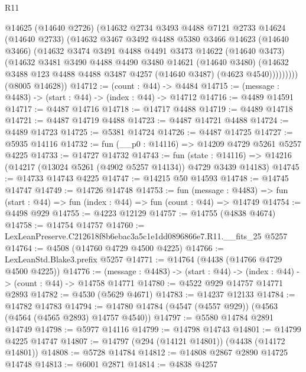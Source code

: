 \begin{lexlean}{R11}
\begin{coremodule}
            @14625
            (@14640 @2726)
            (@14632
              @2734
              @3493
              @4488
              @7121
              @2733
              @14624
              (@14640 @2733)
              (@14632
                @3467
                @3492
                @4488
                @5380
                @3466
                @14623
                (@14640 @3466)
                (@14632
                  @3474
                  @3491
                  @4488
                  @4491
                  @3473
                  @14622
                  (@14640 @3473)
                  (@14632
                    @3481
                    @3490
                    @4488
                    @4490
                    @3480
                    @14621
                    (@14640 @3480)
                    (@14632 @3488 @123 @4488 @4488 @3487 @4257 (@14640 @3487) (@4623 @4540)))))))))
      (@8005 @14628))
@14712 := (count : @44) -> @4484
@14715 := (message : @4483) -> (start : @44) -> (index : @44) -> @14712
@14716 := @4489 @14591
@14717 := @4487 @14716
@14718 := @14717 @4488
@14719 := @4489 @14718
@14721 := @4487 @14719 @4488
@14723 := @4487 @14721 @4488
@14724 := @4489 @14723
@14725 := @5381 @14724
@14726 := @4487 @14725
@14727 := @5935 @14116
@14732 := fun (__p0 : @14116) => @14209 @4729 @5261 @5257 @4225
@14733 := @14727 @14732
@14743 := fun (state : @14116) =>
  @14216 (@14217 (@13024 @5261 (@4902 @5257 @14134)) @4729 @3439 @14183)
@14745 := @14733 @14743 @4225
@14747 := @14215 @50 @14593
@14748 := @14745 @14747
@14749 := @14726 @14748
@14753 := fun (message : @4483) =>
  fun (start : @44) => fun (index : @44) => fun (count : @44) => @14749
@14754 := @4498 @929
@14755 := @4223 @12129
@14757 := @14755 (@4838 @4674)
@14758 := @14754 @14757
@14760 := LexLeanPreserve.C212618f8b6ebac3a5c1e1dd0896866e7.R11.__fits_25 @5257
@14764 := @4508 (@14760 @4729 @4500 @4225)
@14766 := LexLeanStd.Blake3.prefix @5257
@14771 := @14764 (@4438 (@14766 @4729 @4500 @4225))
@14776 := (message : @4483) -> (start : @44) -> (index : @44) -> (count : @44) -> @14758 @14771
@14780 := @4522 @929 @14757 @14771 @2893
@14782 := @4530 (@5629 @4671)
@14783 := @14237 @12133
@14784 := @14782 @14783
@14794 := @14780 @14784 (@4547 (@4557 @929)) (@4563 (@4564 (@4565 @2893) @14757 @4540))
@14797 := @5580 @14784 @2891 @14749
@14798 := @5977 @14116
@14799 := @14798 @14743
@14801 := @14799 @4225 @14747
@14807 := @14797 (@294 (@14121 @14801)) (@4438 (@14172 @14801))
@14808 := @5728 @14784
@14812 := @14808 @2867 @2890 @14725 @14748
@14813 := @6001 @2871
@14814 := @4838 @4257

\end{coremodule}
\end{lexlean}
